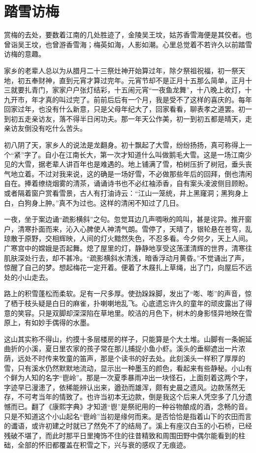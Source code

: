 \section{踏雪访梅}

赏梅的去处，要数着江南的几处胜迹了，金陵吴王坟，姑苏香雪海便是其佼者。也曾诣吴王坟，也曾游香雪海；梅英如海，人影如潮。心里总觉着不若许久以前踏雪访梅的意趣。

家乡的老辈人总以为从腊月二十三祭灶神开始算过年，除夕祭祖祝福，初一祭天地，初五奉财神，直到元宵才算过完年。元宵节却不是正月十五那么简单，正月十三就要扎青门，家家户户张灯结彩，十五闹元宵“一夜鱼龙舞”，十八晚上收灯，十九开市，年才真的叫过完了。前前后后有一个月，我是受不了这样的喜庆的。每年回家过年，也没有什么新意，只是父母年纪大了，回家看看，聊表孝之道罢。初一到初五走亲访友，落不得半日闲功夫。那一年天公作美，初一到初五都是晴天，走亲访友倒没有吃什么苦头。

初八阴了天，家乡人的说法是龙翻身。初十飘起了大雪，纷纷扬扬，真可称得上一个“紧”字了。自小在江南长大，第一次才知道什么叫做鹅毛大雪。这是一场江南少见的大雪，据老辈人讲百年也是难遇的。地上铺满了雪，柏树压折了树冠，垂头丧气地立着。不过对我来说，这的确是一场好雪，不必做那些年后的回拜，倒也清闲自在。捧着缭绕烟雾的清茶，诵诵诗书也不必红袖添香，自有案头凌波侧目顾盼。或者隔着窗户赏看雪景，古人有打油诗云：“江山一笼统，井上黑窿洞；黑狗身上白，白狗身上肿。”真不为过也。这样的清闲不知过了几日。

一夜，坐于案边诵“疏影横斜”之句。忽觉耳边几声啁啾的鸣叫，甚是诧异。推开窗户，清寒扑面而来，沁入心脾使人神清气朗。雪停了，天晴了，银轮悬在苍穹，乱琼散于原野，交相辉映，人间的灯火黯然失色，不忍多看。今夕何夕，天上人间。广寒宫中的嫦娥是否起舞。熄了屋里的灯，静静地享受这荡漾清辉的世界，清寒往肌肤深处行去，却不甚冷。“疏影横斜水清浅，暗香浮动月黄昏。”不觉诵出了声，惊醒了自己的梦。想起梅花一定开着。便着了木屐扎上草绳，出了门，向屋后不远处的小山走去。

路上的积雪蓬松而柔软。足有一尺多厚。使劲跺跺脚，发出了“嘭、嘭”的声音，惊了栖于枝头疑是白日的麻雀，扑喇喇地乱飞。心底遗忘许久的童年的顽皮露出了得意的笑容。只是双脚却深深陷在草地里。皎洁的月色下，树木的身影怪异地映在雪原上，有如妙手偶得的水墨。

这山其实称不得山，约摸十多层楼房的样子，只能算是个大土堆。山脚有一条婉延曲折的小溪，夏日里农家的孩子常在那儿捕捉小鱼小虾。溪头的垂柳遮出一片浓荫，远处不时传来牧童的笛声，那是个读书的好去处。此刻溪头一样积了厚厚的雪，只有溪水仍然默默地流动，显示出一种墨玉的颜色，看起来有些静秘。小山有个鲜为人知的名字“鬯岭”。那是一次夏季暴雨冲出一块怪石，上面刻着这两个字，字迹早已漫漶了，依稀能辨认出来，遒劲而雄浑，颇有史晨之遗风。边款荡然无存，不可考当年的情致了。也许当初本无边款，倒是我这个后来人凭空多了几分遗憾而已。翻了《康熙字典》才知道“鬯”是祭祀用的一种谷物酿成的酒，念畅的音。只是不知道这个小山起名“鬯岭”当初是缘何而来。是否恰恰是指着山下的农田而言的谶语，或许初建之时就已了然免不了的结局了。溪上有座汉白玉的小石桥，已经残破不堪了，而此时那平日里掩饰不住的往昔精致和周围田野中偶尔能看到的柱础，全部的怀旧都覆盖在积雪之下，兴与衰的感叹了无痕迹。

